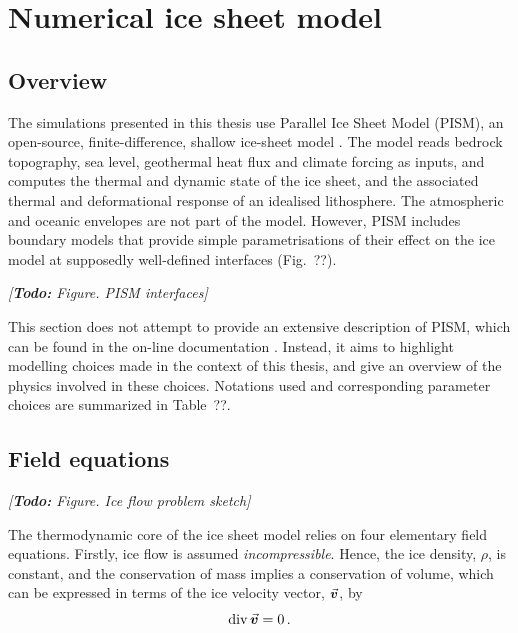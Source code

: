 \documentclass{article}
\newcommand{\todo}[1]{\emph{[\textbf{Todo:} #1]}}
\newcommand{\vect}[1]{\va*{#1}} %
\renewcommand{\div}[1]{\mathrm{div}\,#1}            %
\newcommand{\vv}[0]{\vect{v}}           %
\begin{document}
\section{Numerical ice sheet model}

\subsection{Overview}

The simulations presented in this thesis use Parallel Ice Sheet Model (PISM),
an open-source, finite-difference, shallow ice-sheet model
\citep{PISM-authors.2014}. The model reads bedrock topography, sea level,
geothermal heat flux and climate forcing as inputs, and computes the thermal
and dynamic state of the ice sheet, and the associated thermal and
deformational response of an idealised lithosphere. The atmospheric and oceanic
envelopes are not part of the model. However, PISM includes boundary models
that provide simple parametrisations of their effect on the ice model at
supposedly well-defined interfaces (Fig.~??).

\todo{Figure. PISM interfaces}

This section does not attempt to provide an extensive description of PISM,
which can be found in the on-line documentation \citep{PISM-authors.2014}.
Instead, it aims to highlight modelling choices made in the context of this
thesis, and give an overview of the physics involved in these choices.
Notations used and corresponding parameter choices are summarized in Table~??.


\subsection{Field equations}

\todo{Figure. Ice flow problem sketch}

The thermodynamic core of the ice sheet model relies on four elementary field
equations. Firstly, ice flow is assumed \emph{incompressible}. Hence, the ice
density, $\rho$, is constant, and the
conservation of mass implies a conservation of volume, which can be expressed
in terms of the ice velocity vector, $\vv$, by
\begin{equation}
    \label{eqn:incompressibility}
    \div{\vv} = 0 \,.
\end{equation}
\end{document}
